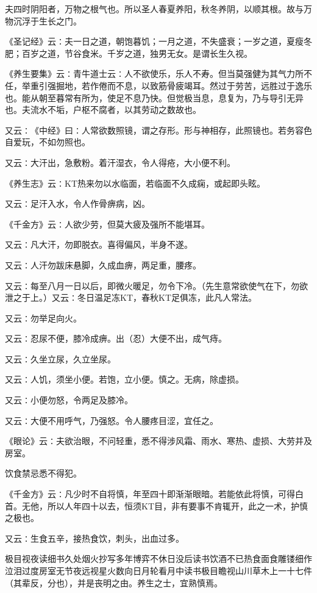 \documentclass[a4paper,12pt,UTF8,twoside]{ctexbook}
\begin{document}
夫四时阴阳者，万物之根气也。所以圣人春夏养阳，秋冬养阴，以顺其根。故与万物沉浮于生长之门。

《圣记经》云∶夫一日之道，朝饱暮饥；一月之道，不失盛衰；一岁之道，夏瘦冬肥；百岁之道，节谷食米。千岁之道，独男无女。是谓长生久视。

《养生要集》云∶青牛道士云∶人不欲使乐，乐人不寿。但当莫强健为其气力所不任，举重引强掘地，若作倦而不息，以致筋骨疲竭耳。然过于劳苦，远胜过于逸乐也。能从朝至暮常有所为，使足不息乃快。但觉极当息，息复为，乃与导引无异也。夫流水不垢，户枢不腐者，以其劳动之数故也。

又云∶《中经》曰∶人常欲数照镜，谓之存形。形与神相存，此照镜也。若务容色自爱玩，不如勿照也。

又云∶大汗出，急敷粉。着汗湿衣，令人得疮，大小便不利。

《养生志》云∶KT热来勿以水临面，若临面不久成痫，或起即头眩。

又云∶足汗入水，令人作骨痹病，凶。

《千金方》云∶人欲少劳，但莫大疲及强所不能堪耳。

又云∶凡大汗，勿即脱衣。喜得偏风，半身不遂。

又云∶人汗勿跋床悬脚，久成血痹，两足重，腰疼。

又云∶每至八月一日以后，即微火暖足，勿令下冷。（先生意常欲使气在下，勿欲泄之于上。）又云∶冬日温足冻KT，春秋KT足俱冻，此凡人常法。

又云∶勿举足向火。

又云∶忍尿不便，膝冷成痹。出（忍）大便不出，成气痔。

又云∶久坐立尿，久立坐尿。

又云∶人饥，须坐小便。若饱，立小便。慎之。无病，除虚损。

又云∶小便勿怒，令两足及膝冷。

又云∶大便不用呼气，乃强怒。令人腰疼目涩，宜任之。

《眼论》云∶夫欲治眼，不问轻重，悉不得涉风霜、雨水、寒热、虚损、大劳并及房室。

饮食禁忌悉不得犯。

《千金方》云∶凡少时不自将慎，年至四十即渐渐眼暗。若能依此将慎，可得白首。无他，所以人年四十以去，恒须KT目，非有要事不肯辄开，此之一术，护慎之极也。

又云∶生食五辛，接热食饮，刺头，出血过多。

极目视夜读细书久处烟火抄写多年博弈不休日没后读书饮酒不已热食面食雕镂细作泣泪过度房室无节夜远视星火数向日月轮看月中读书极目瞻视山川草木上一十七件（其辈反，分也），并是丧明之由。养生之士，宜熟慎焉。
\end{document}
